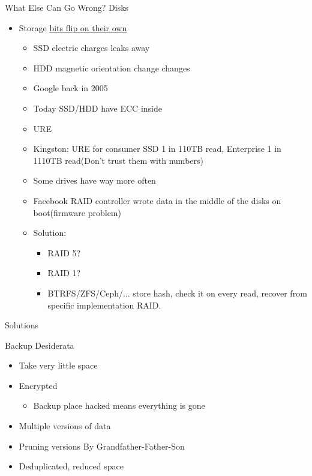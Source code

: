 \documentclass{beamer}
\begin{document}
\begin{frame}{What Else Can Go Wrong? Disks}
	\begin{itemize}
		\item Storage \underline{\textcolor{red}{\href{https://en.wikipedia.org/wiki/Data_degradation\#In_storage}{bits flip on their own}}}
		\begin{itemize}
			\item SSD electric charges leaks away 
			\item HDD magnetic orientation change changes
			\item Google back in 2005 
			\item Today SSD/HDD have ECC inside
			\item URE 
			\item Kingston: URE for consumer SSD 1 in 110TB read, Enterprise 1 in 1110TB read(Don't trust them with numbers)
			\item Some drives have way more often
			\item Facebook RAID controller wrote data in the middle of the disks on boot(firmware problem)
			\item Solution:
			\begin{itemize}
				\item RAID 5?
				\item RAID 1?
				\item BTRFS/ZFS/Ceph/... store hash, check it on every read, recover from specific implementation RAID.
			\end{itemize}
		\end{itemize}
	\end{itemize}
\end{frame}


\begin{frame}
	\begin{center}
		\Huge Solutions
	\end{center}
\end{frame}

\begin{frame}{Backup Desiderata}
	\begin{itemize}
		\item Take very little space
		\item Encrypted
		\begin{itemize}
			\item Backup place hacked means everything is gone
		\end{itemize}
		\item Multiple versions of data
		\item Pruning versions By Grandfather-Father-Son
		\item Deduplicated, reduced space
	\end{itemize}
\end{frame}
\end{document}
